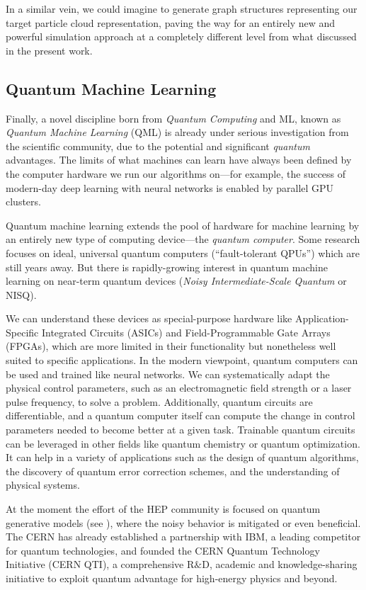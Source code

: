 In a similar vein, we could imagine to generate graph structures representing our target particle cloud representation, paving the way for an entirely new and powerful simulation approach at a completely different level from what discussed in the present work.

\subsection{Quantum Machine Learning}

Finally, a novel discipline born from \emph{Quantum Computing} and ML, known as \emph{Quantum Machine Learning} (QML) is already under serious investigation from the scientific community, due to the potential and significant \emph{quantum} advantages. The limits of what machines can learn have always been defined by the computer hardware we run our algorithms on—for example, the success of modern-day deep learning with neural networks is enabled by parallel GPU clusters.

Quantum machine learning extends the pool of hardware for machine learning by an entirely new type of computing device—the \emph{quantum computer}. Some research focuses on ideal, universal quantum computers (“fault-tolerant QPUs”) which are still years away. But there is rapidly-growing interest in quantum machine learning on near-term quantum devices (\emph{Noisy Intermediate-Scale Quantum} or NISQ).

We can understand these devices as special-purpose hardware like Application-Specific Integrated Circuits (ASICs) and Field-Programmable Gate Arrays (FPGAs), which are more limited in their functionality but nonetheless well suited to specific applications. In the modern viewpoint, quantum computers can be used and trained like neural networks. We can systematically adapt the physical control parameters, such as an electromagnetic field strength or a laser pulse frequency, to solve a problem. Additionally, quantum circuits are differentiable, and a quantum computer itself can compute the change in control parameters needed to become better at a given task. Trainable quantum circuits can be leveraged in other fields like quantum chemistry or quantum optimization. It can help in a variety of applications such as the design of quantum algorithms, the discovery of quantum error correction schemes, and the understanding of physical systems.

At the moment the effort of the HEP community is focused on quantum generative models (see \cite{chan2021quantum}), where the noisy behavior is mitigated or even beneficial. The CERN has already established a partnership with IBM, a leading competitor for quantum technologies, and founded the CERN Quantum Technology Initiative (CERN QTI), a comprehensive R$\&$D, academic and knowledge-sharing initiative to exploit quantum advantage for high-energy physics and beyond. 